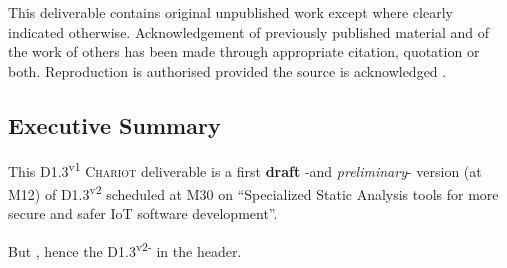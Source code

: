 \documentclass[11pt,a4paper,svgnames]{article}
\begin{document}
\begin{titlepage}
\begin{center}
{{       \bigskip 
     This deliverable contains original unpublished work except where
     clearly indicated otherwise. Acknowledgement of previously
     published material and of the work of others has been made
     through appropriate citation, quotation or
     both. Reproduction is
     authorised provided the source is acknowledged  {}.
    

     \medskip
     }
     }
 \end{center}

 \smallskip
 

  \subsection*{Executive Summary}

  This D1.3\textsuperscript{v1} \textsc{Chariot} deliverable is
  {\color{red}{(was)}} a first \textbf{draft} -and \emph{preliminary}-
  version (at M12) of D1.3\textsuperscript{v2} scheduled at M30 on
  ``Specialized Static Analysis tools for more secure and safer IoT
  software development''.

But {}, hence the
D1.3\textsuperscript{v2-} in the header.


\end{titlepage}
\end{document}
